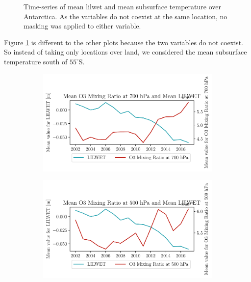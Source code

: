 \documentclass[../main.tex]{subfiles}
\begin{document}
\begin{figure}[hbt!]
\begin{subfigure}[b]{0.45\textwidth}
    \end{subfigure}
    \caption{Time-series of mean \gls{lilwet} and mean subsurface temperature over Antarctica. As the variables do not coexist at the same location, no masking was applied to either variable.}
    \label{fig:timeseries_subsurtemp_100}
\end{figure}

Figure \ref{fig:timeseries_subsurtemp_100} is different to the other plots because the two variables do not coexist. So instead of taking only locations over land, we considered the mean subsurface temperature south of $55^\circ$S. 

\begin{figure}[hbt!]
    \centering
    \begin{subfigure}[b]{0.45\textwidth}
    \includegraphics[width=\textwidth]{images/2021w5/chapter7/hres/tiemseries_o3_700_LIC}
    \end{subfigure}
    \begin{subfigure}[b]{0.45\textwidth}
    \includegraphics[width=\textwidth]{images/2021w5/chapter7/hres/tiemseries_o3_500_LIC}

\end{subfigure}
\end{figure}
\end{document}
